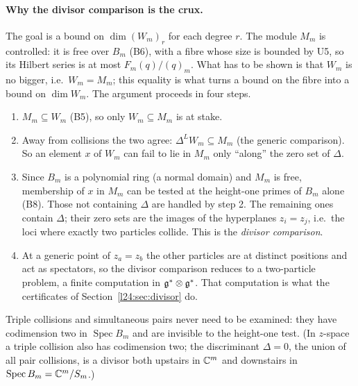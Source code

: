 \paragraph{Why the divisor comparison is the crux.} The goal is a bound on $\dim(W_m)_r$ for each degree $r$. The
module $M_m$ is controlled: it is free over $B_m$ (B6), with a fibre whose size is bounded by U5, so its Hilbert series
is at most $F_m(q)/(q)_m$. What has to be shown is that $W_m$ is no bigger, i.e.\ $W_m=M_m$; this equality is what turns
a bound on the fibre into a bound on $\dim W_m$. The argument proceeds in four steps.
\begin{enumerate}
\item $M_m\subseteq W_m$ (B5), so only $W_m\subseteq M_m$ is at stake.
\item Away from collisions the two agree: $\Delta^LW_m\subseteq M_m$ (the generic comparison). So an element $x$ of $W_m$
  can fail to lie in $M_m$ only ``along'' the zero set of $\Delta$.
\item Since $B_m$ is a polynomial ring (a normal domain) and $M_m$ is free, membership of $x$ in $M_m$ can be tested at the
  height-one primes of $B_m$ alone (B8). Those not containing $\Delta$ are handled by step 2. The remaining ones contain
  $\Delta$; their zero sets are the images of the hyperplanes $z_i=z_j$, i.e.\ the loci where exactly two particles
  collide. This is the \emph{divisor comparison}.
\item At a generic point of $z_a=z_b$ the other particles are at distinct positions and act as spectators, so the
  divisor comparison reduces to a two-particle problem, a finite computation in $\mathfrak g^*\otimes\mathfrak g^*$.
  That computation is what the certificates of Section~\ref{l24:sec:divisor} do.
\end{enumerate}
Triple collisions and simultaneous pairs never need to be examined: they have codimension two in $\operatorname{Spec}B_m$
and are invisible to the height-one test. (In $z$-space a triple collision also has codimension two; the discriminant
$\Delta=0$, the union of all pair collisions, is a divisor both upstairs in ${\mathbb{C}}^m$ and downstairs in
$\operatorname{Spec}B_m={\mathbb{C}}^m/S_m$.)

